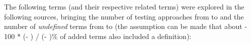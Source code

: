 The following terms (and their respective related terms) were explored
in the following sources, bringing the number of testing
approaches from \the\TotalBefore{} to \the\TotalAfter{} and the number of
\emph{undefined} terms from \the\UndefBefore{} to \the\UndefAfter{} (the
assumption can be made that about \the{} - 100 * (\UndefAfter -
\UndefBefore) / (\TotalAfter - \TotalBefore)\relax\% of added terms also
included a definition):


